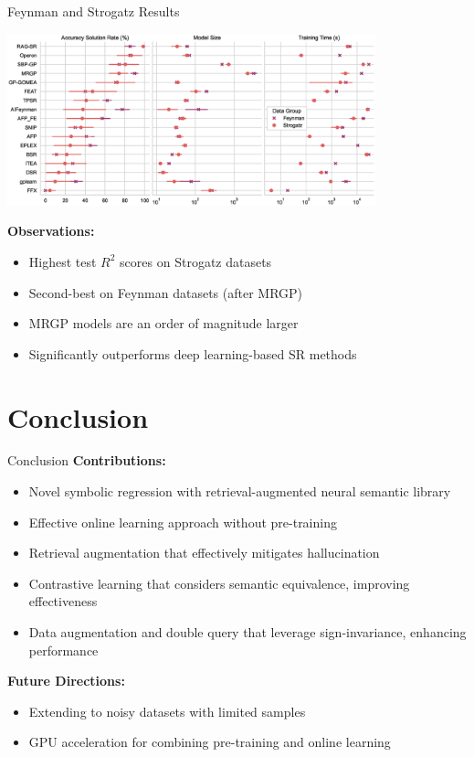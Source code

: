 \documentclass[aspectratio=1610]{beamer}
\begin{document}
    \begin{frame}{Feynman and Strogatz Results}
        \begin{center}
            \includegraphics[width=0.8\textwidth]{figs/pairgrid_accuracy_solution_rate_(pct)_model_size_training-time-(s).eps}
        \end{center}

        \textbf{Observations:}
        \begin{itemize}
            \item Highest test $R^2$ scores on Strogatz datasets
            \item Second-best on Feynman datasets (after MRGP)
            \item MRGP models are an order of magnitude larger
            \item Significantly outperforms deep learning-based SR methods
        \end{itemize}
    \end{frame}


    \section{Conclusion}

    \begin{frame}{Conclusion}
        \textbf{Contributions:}
        \begin{itemize}
            \item Novel symbolic regression with retrieval-augmented neural semantic library
            \item Effective online learning approach without pre-training
            \item Retrieval augmentation that effectively mitigates hallucination
            \item Contrastive learning that considers semantic equivalence, improving effectiveness
            \item Data augmentation and double query that leverage sign-invariance, enhancing performance
        \end{itemize}

        \textbf{Future Directions:}
        \begin{itemize}
            \item Extending to noisy datasets with limited samples
            \item GPU acceleration for combining pre-training and online learning
        \end{itemize}
    \end{frame}
\end{document}
